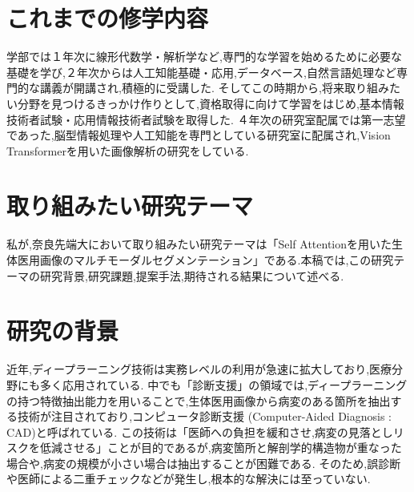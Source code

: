 \documentclass[a4j,10pt, twocolumn]{jarticle}
\begin{document}
\section{これまでの修学内容}
学部では１年次に線形代数学・解析学など,専門的な学習を始めるために必要な基礎を学び,２年次からは人工知能基礎・応用,データベース,自然言語処理など専門的な講義が開講され,積極的に受講した.
そしてこの時期から,将来取り組みたい分野を見つけるきっかけ作りとして,資格取得に向けて学習をはじめ,基本情報技術者試験・応用情報技術者試験を取得した.
４年次の研究室配属では第一志望であった,脳型情報処理や人工知能を専門としている研究室に配属され,Vision Transformerを用いた画像解析の研究をしている.

\section{取り組みたい研究テーマ}
私が,奈良先端大において取り組みたい研究テーマは「Self Attentionを用いた生体医用画像のマルチモーダルセグメンテーション」である.本稿では,この研究テーマの研究背景,研究課題,提案手法,期待される結果について述べる.
\section{研究の背景}
近年,ディープラーニング技術は実務レベルの利用が急速に拡大しており,医療分野にも多く応用されている.
中でも「診断支援」の領域では,ディープラーニングの持つ特徴抽出能力を用いることで,生体医用画像から病変のある箇所を抽出する技術が注目されており,コンピュータ診断支援 (Computer-Aided Diagnosis : CAD)と呼ばれている. 
この技術は「医師への負担を緩和させ,病変の見落としリスクを低減させる」ことが目的であるが,病変箇所と解剖学的構造物が重なった場合や,病変の規模が小さい場合は抽出することが困難である.
そのため,誤診断や医師による二重チェックなどが発生し,根本的な解決には至っていない.
\end{document}

